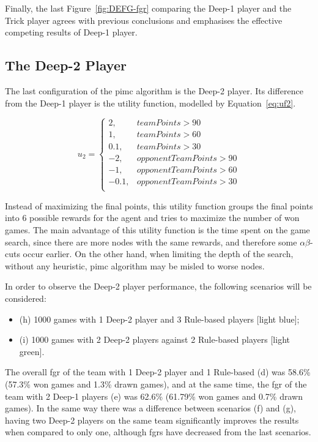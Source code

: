 Finally, the last Figure~\ref{fig:DEFG-fgr} comparing the Deep-1 player and the Trick player agrees with previous conclusions and emphasises the effective competing results of Deep-1 player.


\subsection{The Deep-2 Player}

The last configuration of the \ac{pimc} algorithm is the Deep-2 player.
Its difference from the Deep-1 player is the utility function, modelled by Equation~\ref{eq:uf2}.

\begin{equation} \label{eq:uf2}
u_2 = \left\{
                \begin{array}{ll}
                  2, & teamPoints > 90\\
                  1, & teamPoints > 60\\
                  0.1, & teamPoints > 30\\
                  -2, & opponentTeamPoints >90\\
                  -1, & opponentTeamPoints > 60\\
                  -0.1, & opponentTeamPoints > 30\\
                \end{array}
              \right.
\end{equation}

Instead of maximizing the final points, this utility function groups the final points into 6 possible rewards for the agent and tries to maximize the number of won games.
The main advantage of this utility function is the time spent on the game search, since there are more nodes with the same rewards, and therefore some $\alpha\beta$-cuts occur earlier.
On the other hand, when limiting the depth of the search, without any heuristic, \ac{pimc} algorithm may be misled to worse nodes.

In order to observe the Deep-2 player performance, the following scenarios will be considered:
\begin{itemize}
\item (h) 1000 games with 1 Deep-2 player and 3 Rule-based players [light blue];
\item (i) 1000 games with 2 Deep-2 players against 2 Rule-based players [light green].
\end{itemize}

The overall \ac{fgr} of the team with 1 Deep-2 player and 1 Rule-based (d) was 58.6\% (57.3\% won games and 1.3\% drawn games), and at the same time, the \ac{fgr} of the team with 2 Deep-1 players (e) was 62.6\% (61.79\% won games and 0.7\% drawn games).
In the same way there was a difference between scenarios (f) and (g), having two Deep-2 players on the same team significantly improves the results when compared to only one, although \acp{fgr} have decreased from the last scenarios.

